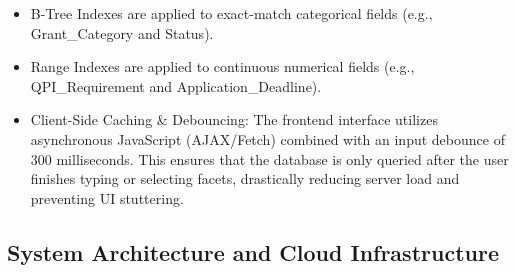 \begin{itemize}
  \item B-Tree Indexes are applied to exact-match categorical fields (e.g., Grant\_Category and Status).
  \item Range Indexes are applied to continuous numerical fields (e.g., QPI\_Requirement and Application\_Deadline).
  \item Client-Side Caching \& Debouncing: The frontend interface utilizes asynchronous JavaScript (AJAX/Fetch) combined with an input debounce of 300 milliseconds. This ensures that the database is only queried after the user finishes typing or selecting facets, drastically reducing server load and preventing UI stuttering.
\end{itemize}

\subsection{System Architecture and Cloud Infrastructure}

